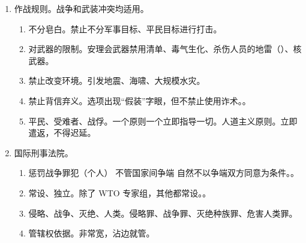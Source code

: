\begin{enumerate}
        \begin{kk}{战时中立国。战时中立不是永久中立。}
          \begin{enumerate}
            \item 不作为。不能直接参与战争、提供资金 \hz 武器等资助、不能介入。
            \item 防止。交战国利用中立国的领土从事有关的战争行为。
            \item 容忍。对你带来的不便。
          \end{enumerate}
        \end{kk}
  \item 作战规则。战争和武装冲突均适用。
        \begin{enumerate}
          \item 不分皂白。禁止不分军事目标、平民目标进行打击。
          \item 对武器的限制。安理会武器禁用清单、毒气生化、杀伤人员的地雷（）、核武器。
          \item 禁止改变环境。引发地震、海啸、大规模水灾。
          \item 禁止背信弃义。选项出现“假装”字眼，但不禁止使用诈术。。
          \item 平民、受难者、战俘。一个原则一个立即指导一切。人道主义原则。立即遣返，不得迟延。
        \end{enumerate}
  \item 国际刑事法院。
        \begin{enumerate}
          \item 惩罚战争罪犯（个人） \yjt 不管国家间争端 \yjt 自然不以争端双方同意为条件。。
          \item 常设、独立。除了 WTO 专家组，其他都常设。。
          \item 侵略、战争、灭绝、人类。侵略罪、战争罪、灭绝种族罪、危害人类罪。
          \item 管辖权依据。非常宽，沾边就管。
        \end{enumerate}
\end{enumerate}

